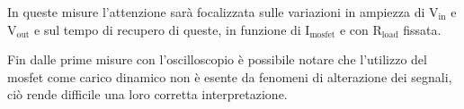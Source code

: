 In queste misure l'attenzione sarà focalizzata sulle variazioni in ampiezza di $\mathrm{V_{in}}$ e $\mathrm{V_{out}}$ e sul tempo di recupero di queste, in funzione di $\mathrm{I_{mosfet}}$ e con $\mathrm{R_{load}}$ fissata.

Fin dalle prime misure con l'oscilloscopio è possibile notare che l'utilizzo del mosfet come carico dinamico non è esente da fenomeni di alterazione dei segnali, ciò rende difficile una loro corretta interpretazione. 
